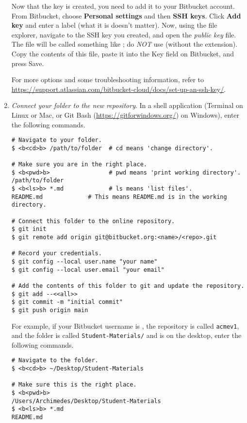 \begin{enumerate}
Now that the key is created, you need to add it to your Bitbucket account.
From Bitbucket, choose \textbf{Personal settings} and then \textbf{SSH keys}.
Click \textbf{Add key} and enter a label (what it is doesn't matter).
Now, using the file explorer, navigate to the SSH key you created, and open the \emph{public key} file.
The file will be called something like ; do \emph{NOT} use  (without the  extension).
Copy the contents of this file, paste it into the Key field on Bitbucket, and press Save.

For more options and some troubleshooting information, refer to \url{https://support.atlassian.com/bitbucket-cloud/docs/set-up-an-ssh-key/}.

\item \emph{Connect your folder to the new repository}.
\label{step:connect-folder}
In a shell application (Terminal on Linux or Mac, or Git Bash (\url{https://gitforwindows.org/}) on Windows), enter the following commands.

\begin{lstlisting}
# Navigate to your folder.
$ <b<cd>b> /path/to/folder  # cd means 'change directory'.

# Make sure you are in the right place.
$ <b<pwd>b>                 # pwd means 'print working directory'.
/path/to/folder
$ <b<ls>b> *.md             # ls means 'list files'.
README.md             # This means README.md is in the working directory.

# Connect this folder to the online repository.
$ git init
$ git remote add origin git@bitbucket.org:<name>/<repo>.git

# Record your credentials.
$ git config --local user.name "your name"
$ git config --local user.email "your email"

# Add the contents of this folder to git and update the repository.
$ git add --<<all>>
$ git commit -m "initial commit"
$ git push origin main
\end{lstlisting}

For example, if your Bitbucket username is , the repository is called \texttt{acmev1}, and the folder is called \texttt{Student-Materials/} and is on the desktop, enter the following commands.

\begin{lstlisting}
# Navigate to the folder.
$ <b<cd>b> ~/Desktop/Student-Materials

# Make sure this is the right place.
$ <b<pwd>b>
/Users/Archimedes/Desktop/Student-Materials
$ <b<ls>b> *.md
README.md


\end{lstlisting}
\end{enumerate}
